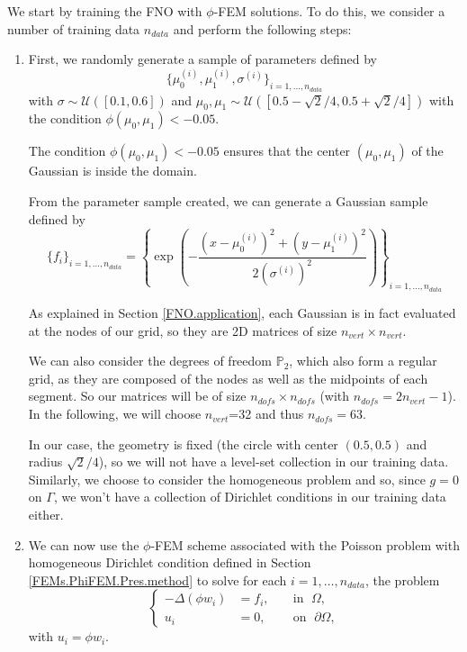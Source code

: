 We start by training the FNO with $\phi$-FEM solutions. To do this, we consider a number of training data $n_{data}$ and perform the following steps:
\begin{enumerate}[label=\textbullet]
	\item First, we randomly generate a sample of parameters defined by
	\begin{equation*}
		\{\mu_0^{(i)},\mu_1^{(i)},\sigma^{(i)}\}_{i=1,\dots,n_{data}}
	\end{equation*}
	with $\sigma \sim \mathcal{U}([0.1,0.6])$ and $\mu_0, \mu_1 \sim \mathcal{U}([0.5-\sqrt{2}/4, 0.5+\sqrt{2}/4])$ with the condition $\phi(\mu_0, \mu_1) < -0.05$.
	
	\begin{Rem}
		The condition $\phi(\mu_0, \mu_1) < -0.05$ ensures that the center $(\mu_0, \mu_1)$ of the Gaussian is inside the domain.
	\end{Rem}
	
	From the parameter sample created, we can generate a Gaussian sample defined by
	\begin{equation*}
		\{f_i\}_{i=1,\dots,n_{data}}=\left\{\exp\left(-\frac{(x-\mu_0^{(i)})^2 + (y-\mu_1^{(i)})^2}{2(\sigma^{(i)})^2}\right)\right\}_{i=1,\dots,n_{data}}
	\end{equation*}
	
	\begin{Rem}
		As explained in Section \ref{FNO.application}, each Gaussian is in fact evaluated at the nodes of our grid, so they are 2D matrices of size $n_{vert}\times n_{vert}$.
		
		We can also consider the degrees of freedom $\mathbb{P}_2$, which also form a regular grid, as they are composed of the nodes as well as the midpoints of each segment. So our matrices will be of size $n_{dofs}\times n_{dofs}$ (with $n_{dofs}=2n_{vert}-1$). In the following, we will choose $n_{vert}$=32 and thus $n_{dofs}=63$.
	\end{Rem}
	
	In our case, the geometry is fixed (the circle with center $(0.5,0.5)$ and radius $\sqrt{2}/4$), so we will not have a level-set collection in our training data. Similarly, we choose to consider the homogeneous problem and so, since $g=0$ on $\Gamma$, we won't have a collection of Dirichlet conditions in our training data either.
	
	\item We can now use the $\phi$-FEM scheme associated with the Poisson problem with homogeneous Dirichlet condition defined in Section \ref{FEMs.PhiFEM.Pres.method} to solve for each $i=1,\dots,n_{data}$, the problem
	\begin{equation*}
		\left\{
		\begin{aligned}
			-\Delta (\phi w_i) &= f_i, \; &&\text{in } \; \Omega, \\
			u_i&=0, \; &&\text{on } \; \partial\Omega,
		\end{aligned}
		\right.
	\end{equation*}
	with $u_i=\phi w_i$.
	

\end{enumerate}
